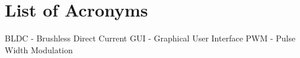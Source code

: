 \section{List of Acronyms}
  
\begin{enumerate} 
  BLDC - Brushless Direct Current 
  GUI - Graphical User Interface
  PWM - Pulse Width Modulation
\end{enumerate}
